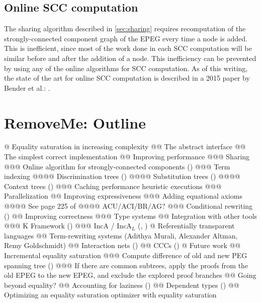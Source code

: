 \documentclass[11pt]{report}
\begin{document}
\section{Online SCC computation}
\label{sec:online-scc}

The sharing algorithm described in \autoref{sec:sharing} requires recomputation
of the strongly-connected component graph of the EPEG every time a node is
added. This is inefficient, since most of the work done in each SCC computation
will be similar before and after the addition of a node. This inefficiency can
be prevented by using any of the online algorithms for SCC computation. As of
this writing, the state of the art for online SCC computation is described in
a 2015 paper by Bender et al.: \cite{bender-2015}.

\chapter{RemoveMe: Outline}

\begin{easylist}[enumerate]
@ Equality saturation in increasing complexity
@@ The abstract interface
@@ The simplest correct implementation
@@ Improving performance
@@@ Sharing
@@@ Online algorithm for strongly-connected components (\cite{bender-2015})
@@@ Term indexing
@@@@ Discrimination trees (\cite{handbook-ch26})
@@@@ Substitution trees (\cite{graf-1994})
@@@@ Context trees (\cite{ganzinger-2001})
@@@ Caching performance heuristic executions
@@@ Parallelization
@@ Improving expressiveness
@@@ Adding equational axioms
@@@@ See page 225 of \cite{siekmann-1989}
@@@@ ACU/ACI/BR/AG?
@@@ Conditional rewriting (\cite{rosu-2005})
@@ Improving correctness
@@@ Type systems
@@ Integration with other tools
@@@ K Framework (\cite{rosu-2010})
@@@ IncA / $\mathrm{IncA}_L$ (\cite{szabo-2016}, \cite{szabo-2017})
@ Referentially transparent languages
@@ Term-rewriting systems (Adithya Murali, Alexander Altman, Remy Goldschmidt)
@@ Interaction nets (\cite{asperti-1998})
@@ CCCs (\cite{elliott-2017})
@ Future work
@@ Incremental equality saturation
@@@ Compute difference of old and new PEG spanning tree (\cite{lempsink-2009})
@@@ If there are common subtrees, apply the proofs from the old EPEG to the new EPEG, and exclude the explored proof branches
@@ Going beyond equality?
@@ Accounting for laziness (\cite{okasaki-1998})
@@ Dependent types (\cite{selsam-2017})
@@ Optimizing an equality saturation optimizer with equality saturation
\end{easylist}
\end{document}
